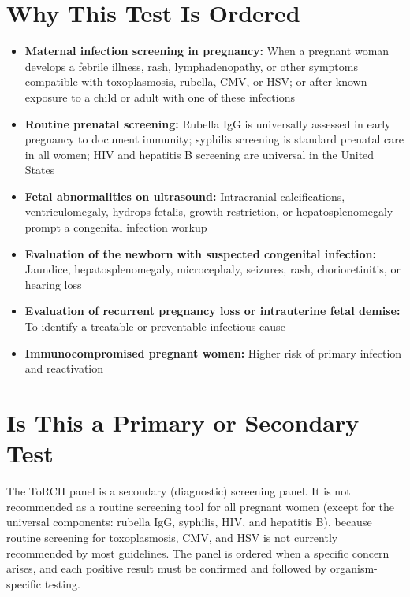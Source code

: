 \section*{Why This Test Is Ordered}
\begin{itemize}
  \item \textbf{Maternal infection screening in pregnancy:} When a pregnant woman develops a febrile illness, rash, lymphadenopathy, or other symptoms compatible with toxoplasmosis, rubella, CMV, or HSV; or after known exposure to a child or adult with one of these infections
  \item \textbf{Routine prenatal screening:} Rubella IgG is universally assessed in early pregnancy to document immunity; syphilis screening is standard prenatal care in all women; HIV and hepatitis B screening are universal in the United States
  \item \textbf{Fetal abnormalities on ultrasound:} Intracranial calcifications, ventriculomegaly, hydrops fetalis, growth restriction, or hepatosplenomegaly prompt a congenital infection workup
  \item \textbf{Evaluation of the newborn with suspected congenital infection:} Jaundice, hepatosplenomegaly, microcephaly, seizures, rash, chorioretinitis, or hearing loss
  \item \textbf{Evaluation of recurrent pregnancy loss or intrauterine fetal demise:} To identify a treatable or preventable infectious cause
  \item \textbf{Immunocompromised pregnant women:} Higher risk of primary infection and reactivation
\end{itemize}

\section*{Is This a Primary or Secondary Test}
The ToRCH panel is a secondary (diagnostic) screening panel. It is not recommended as a routine screening tool for all pregnant women (except for the universal components: rubella IgG, syphilis, HIV, and hepatitis B), because routine screening for toxoplasmosis, CMV, and HSV is not currently recommended by most guidelines. The panel is ordered when a specific concern arises, and each positive result must be confirmed and followed by organism-specific testing.


